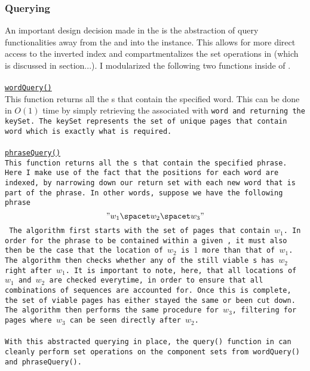 \documentclass[11pt]{article}
\begin{document}
\subsubsection{Querying}
An important design decision made in the \WI{} is the abstraction of query functionalities away from the \WQE{} and into the \WI{} instance. This allows for more direct access to the inverted index and compartmentalizes the set operations in \WQE{} (which is discussed in section...). I modularized the following two functions inside of \WI{}. \\ \\
\underline{\tt{wordQuery()}}\\
This function returns all the \Page s that contain the specified word. This can be done in $O(1)$ time by simply retrieving the \hm{} associated with \tt{word} and returning the \tt{keySet}. The \tt{keySet} represents the set of unique pages that contain \tt{word} which is exactly what is required. 
\\ \\
\underline{\tt{phraseQuery()}} \\
This function returns all the \Page s that contain the specified phrase. Here I make use of the fact that the positions for each word are indexed, by narrowing down our return set with each new word that is part of the phrase. In other words, suppose we have the following phrase
\[
" w_1 \spacet w_2 \spacet w_3 "
\]
The algorithm first starts with the set of pages that contain $w_1$. In order for the phrase to be contained within a given \Page{}, it must also then be the case that the location of $w_2$ is $1$ more than that of $w_1$. The algorithm then checks whether any of the still viable \Page s has $w_2$ right after $w_1$. It is important to note, here, that all locations of $w_1$ and $w_2$ are checked everytime, in order to ensure that all combinations of sequences are accounted for. Once this is complete, the set of viable pages has either stayed the same or been cut down. The algorithm then performs the same procedure for $w_3$, filtering for pages where $w_3$ can be seen directly after $w_2$.\\ \\
With this abstracted querying in place, the \tt{query()} function in \WQE{} can cleanly perform set operations on the component sets from \tt{wordQuery()} and \tt{phraseQuery()}.
\end{document}
